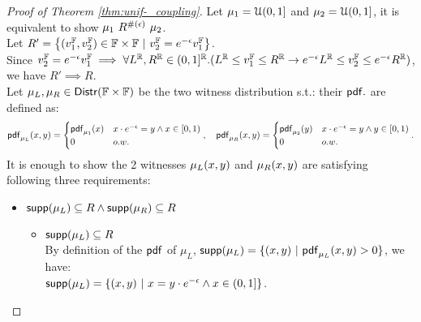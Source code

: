 \documentclass[a4paper,11pt]{article}
\begin{document}
\begin{proof}[Proof of Theorem \ref{thm:unif-_coupling}]
%
Let $\mu_1 = \mathcal{U}(0, 1]$ and $\mu_2 = \mathcal{U}(0, 1]$, it is equivalent to show 
${\mu_1} ~ R^{\#(\epsilon)} ~ \mu_2$.
%
\\
%
Let $R' =
		\left \{(v^{\mathbb{F}}_1, v^{\mathbb{F}}_2) \in {\mathbb{F}} \times {\mathbb{F}} 
		~|~
		v^{\mathbb{F}}_2 =  e^{-\epsilon}  v^{\mathbb{F}}_1
		\right \}$.
\\
Since $v^{\mathbb{F}}_2 = e^{-\epsilon} v^{\mathbb{F}}_1 \implies 
\forall L^{\mathbb{R}}, R^{\mathbb{R}} \in (0,1]^{\mathbb{R}}. (
L^{\mathbb{R}} \leq v^{\mathbb{F}}_1 \leq R^{\mathbb{R}}
\rightarrow
e^{-\epsilon} L^{\mathbb{R}} \leq v^{\mathbb{F}}_2 \leq 	e^{-\epsilon} R^{\mathbb{R}})$,
 we have $R' \implies R$.
%
\\
%
Let $\mu_L, \mu_R \in \mathsf{Distr}(\mathbb{F} \times \mathbb{F})$ 
be the two witness distribution s.t.:
their $\mathsf{pdf}.$ are defined as:
\[
	\mathsf{pdf}_{\mu_L}(x, y) = 
	\begin{cases}
	\mathsf{pdf}_{\mu_1}(x) & x \cdot e^{-\epsilon} = y  \land x \in [0, 1)\\
	0       & o.w.
	\end{cases},
~~~
	\mathsf{pdf}_{\mu_R}(x, y) = 
	\begin{cases}
	\mathsf{pdf}_{\mu_2}(y) & x \cdot e^{-\epsilon} = y  \land y \in [0, 1)\\
	0       & o.w.
	\end{cases}.
\]
It is enough to show the 2 witnesses $\mu_L(x, y)$ and $\mu_R(x, y)$ are satisfying following three requirements:
\begin{itemize}
	\item $\mathsf{supp}(\mu_L) \subseteq R \land \mathsf{supp}(\mu_R) \subseteq R$
%
	\begin{itemize}
		\item $\mathsf{supp}(\mu_L) \subseteq R$ 
		\\
		By definition of the $\mathsf{pdf}$ of $\mu_L$, 
		$\mathsf{supp}(\mu_L) = \{(x, y) ~\vert~ \mathsf{pdf}_{\mu_L}(x, y) > 0\}$,
		we have: 
		\\
		$\mathsf{supp}(\mu_L) = \{(x, y) ~\vert~ 
		x = y \cdot e^{-\epsilon} \land x \in (0, 1]\}$.

\end{itemize}
\end{itemize}
\end{proof}
\end{document}
